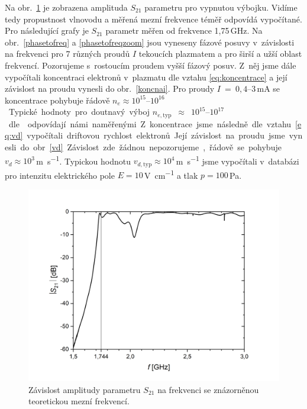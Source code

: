 \documentclass[a4paper,12pt]{article}
\begin{document}
Na obr.~\ref{S21vyp} je zobrazena 
amplituda $S_{21}$ parametru pro vypnutou výbojku. Vidíme tedy propustnost 
vlnovodu a měřená mezní frekvence téměř odpovídá vypočítané. Pro následující 
grafy je $S_{21}$ parametr měřen od frekvence 1,75\,\si{\giga\hertz}. Na 
obr.~\ref{phasetofreq} a \ref{phasetofreqzoom} jsou vyneseny fázové posuvy
v~závislosti na frekvenci pro 7 různých proudů $I$ tekoucích plazmatem a pro 
širší a užší oblast frekvencí. Pozorujeme s~rostoucím proudem vyšší fázový 
posuv. Z~něj jsme dále vypočítali koncentraci elektronů v~plazmatu dle vztahu 
\eqref{eq:koncentrace} a její závislost na proudu vynesli do 
obr.~\ref{koncnai}. Pro proudy $I$~=~$0,4$--$3$\,\si{\milli\ampere} se 
koncentrace 
pohybuje řádově $n_e \approx 10^{15}$--$10^{16}$\,\si{\cubic\per\meter}. 
Typické 
hodnoty pro doutnavý výboj
$n_{e,\text{typ}}$~$\approx$~$10^{15}$--$10^{17}$\,\si{\cubic\per\meter} dle
\cite{conc} odpovídají námi naměřenými. Z~koncentrace jsme následně dle vztahu 
\eqref{eq:vd} vypočítali driftovou rychlost elektronů. Její závislost na proudu 
jsme vynesli do obr.~\ref{vd}. Závislost zde žádnou nepozorujeme, řádově se 
pohybuje $v_d \approx 10^3$\,\si{\meter\per\second}. Typickou hodnotu 
$v_{d,\text{typ}} \approx 10^4$\,\si{\meter\per\second} jsme vypočítali 
v~databázi \cite{lxcat} pro intenzitu elektrického pole $E = 
10$\,\si{\volt\per\centi\meter} a tlak $p = 100$\,\si{\pascal}.


\begin{figure}[h]
	\centering
	\includegraphics[width=0.9\linewidth]{S21vyp.png}
	\caption{Závislost amplitudy parametru $S_{21}$ na frekvenci se znázorněnou 
	teoretickou mezní frekvencí.}
	\label{S21vyp}
\end{figure}
\end{document}

